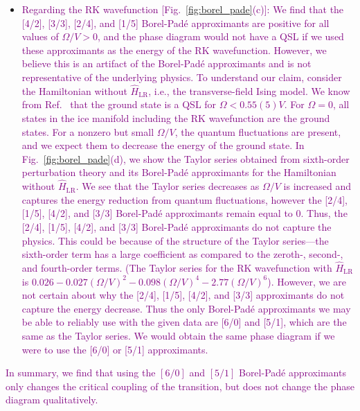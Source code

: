 \documentclass[twocolumn,superscriptaddress,amsmath,amssymb,aps,prx,nofootinbib]{revtex4-2}
\newcommand{\newtext}[1]{\textcolor{purple}{#1}}
\begin{document}
\begin{itemize}
    \item \newtext{Regarding the RK wavefunction [Fig.~\ref{fig:borel_pade}(c)]: We find that the [4/2], [3/3], [2/4], and [1/5] Borel-Pad\'e approximants are positive for all values of $\Omega/V > 0$, and the phase diagram would not have a QSL if we used these approximants as the energy of the RK wavefunction. 
    However, we believe this is an artifact of the Borel-Pad\'e approximants and is not representative of the underlying physics. To understand our claim, consider the Hamiltonian without $\hat{H}_{\text{LR}}$, i.e., the transverse-field Ising model. We know from Ref.~\cite{emonts2018monte} that the ground state is a QSL for $\Omega < 0.55(5) V$. For $\Omega =0$, all states in the ice manifold including the RK wavefunction are the ground states. 
    For a nonzero but small $\Omega/V$, the quantum fluctuations are present, and we expect them to decrease the energy of the ground state. In 
    Fig.~\ref{fig:borel_pade}(d), we show the Taylor series obtained from sixth-order perturbation theory and its Borel-Pad\'e approximants for the Hamiltonian without $\hat{H}_{\text{LR}}$. 
    We see that the Taylor series decreases as $\Omega/V$ is increased and captures the energy reduction from quantum fluctuations, however the [2/4], [1/5], [4/2], and [3/3] Borel-Pad\'e approximants remain equal to 0.
    Thus, the [2/4], [1/5], [4/2], and [3/3] Borel-Pad\'e approximants do not capture the physics. This could be because of the structure of the Taylor series---the sixth-order term has a large coefficient as compared to the zeroth-, second-, and fourth-order terms. (The Taylor series for the RK wavefunction with $\hat{H}_{\text{LR}}$ is $0.026 - 0.027 (\Omega/V)^2 - 0.098 (\Omega/V)^4 - 2.77 (\Omega/V)^6$). However, we are not certain about why the [2/4], [1/5], [4/2], and [3/3] approximants do not capture the energy decrease.
    Thus the only Borel-Pad\'e approximants we may be able to reliably use with the given data are [6/0] and [5/1], which are the same as the Taylor series. We would obtain the same phase diagram if we were to use the [6/0] or [5/1] approximants.}
\end{itemize}
\newtext{In summary, we find that using the $[6/0]$ and $[5/1]$ Borel-Pad\'e approximants only changes the critical coupling of the transition, but does not change the phase diagram qualitatively.}
\end{document}
